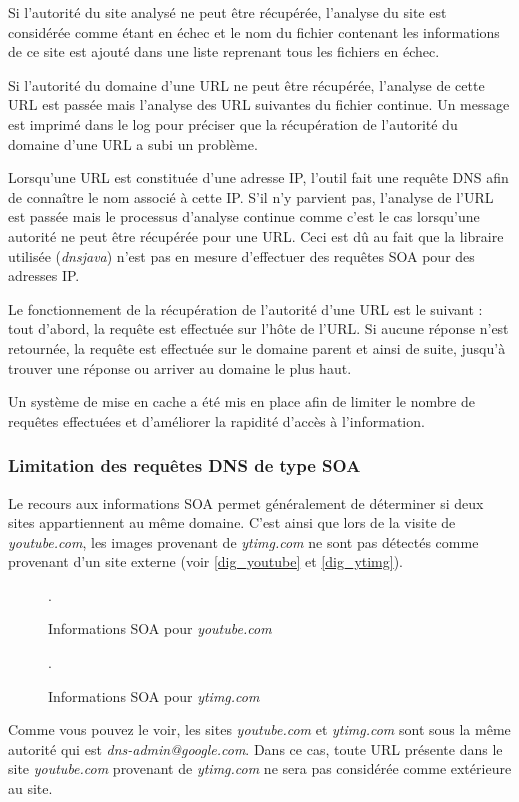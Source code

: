 Si l'autorité du site analysé ne peut être récupérée, l'analyse du site est considérée comme étant en échec et le nom du fichier contenant les informations de ce site est ajouté dans une liste reprenant tous les fichiers en échec.

Si l'autorité du domaine d'une URL ne peut être récupérée, l'analyse de cette URL est passée mais l'analyse des URL suivantes du fichier continue. Un message est imprimé dans le log pour préciser que la récupération de l'autorité du domaine d'une URL a subi un problème.

Lorsqu'une URL est constituée d'une adresse IP, l'outil fait une requête DNS afin de connaître le nom associé à cette IP. S'il n'y parvient pas, l'analyse de l'URL est passée mais le processus d'analyse continue comme c'est le cas lorsqu'une autorité ne peut être récupérée pour une URL. Ceci est dû au fait que la libraire utilisée (\textit{dnsjava}) n'est pas en mesure d'effectuer des requêtes SOA pour des adresses IP.

Le fonctionnement de la récupération de l'autorité d'une URL est le suivant : tout d'abord, la requête est effectuée sur l'hôte de l'URL. Si aucune réponse n'est retournée, la requête est effectuée sur le domaine parent et ainsi de suite, jusqu'à trouver une réponse ou arriver au domaine le plus haut.

Un système de mise en cache a été mis en place afin de limiter le nombre de requêtes effectuées et d'améliorer la rapidité d'accès à l'information.

\subsubsection{Limitation des requêtes DNS de type SOA}
Le recours aux informations SOA permet généralement de déterminer si deux sites appartiennent au même domaine. C'est ainsi que lors de la visite de \textit{youtube.com}, les images provenant de \textit{ytimg.com} ne sont pas détectés comme provenant d'un site externe (voir \autoref{dig_youtube} et \autoref{dig_ytimg}).

\begin{figure}[h]
	\centering
	
	\caption{\label{dig_youtube}Informations SOA pour \textit{youtube.com}}.
\end{figure}

\begin{figure}[h]
	\centering
	
	\caption{\label{dig_ytimg}Informations SOA pour \textit{ytimg.com}}.
\end{figure}
Comme vous pouvez le voir, les sites \textit{youtube.com} et \textit{ytimg.com} sont sous la même autorité qui est \textit{dns-admin@google.com}. Dans ce cas, toute URL présente dans le site \textit{youtube.com} provenant de \textit{ytimg.com} ne sera pas considérée comme extérieure au site.
\newline

